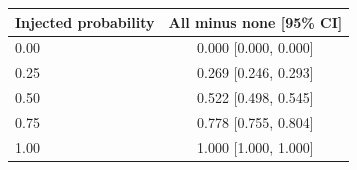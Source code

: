 \begin{tabular}{lc}\toprule
Injected probability & All minus none [95\% CI]\\\midrule
0.00 & 0.000 [0.000, 0.000]\\
0.25 & 0.269 [0.246, 0.293]\\
0.50 & 0.522 [0.498, 0.545]\\
0.75 & 0.778 [0.755, 0.804]\\
1.00 & 1.000 [1.000, 1.000]\\\bottomrule\end{tabular}
